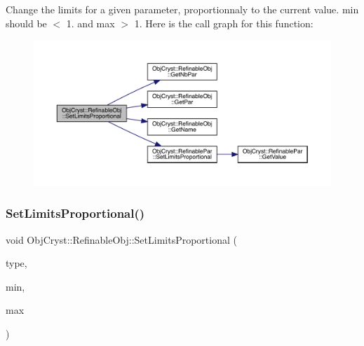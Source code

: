 Change the limits for a given parameter, proportionnaly to the current value. min should be $<$ 1. and max $>$ 1. Here is the call graph for this function\+:
\nopagebreak
\begin{figure}[H]
\begin{center}
\leavevmode
\includegraphics[width=350pt]{class_obj_cryst_1_1_refinable_obj_adc6b05a95d524d600910a47861190e84_cgraph}
\end{center}
\end{figure}
\mbox{\label{class_obj_cryst_1_1_refinable_obj_a75741a3e7f7f1740243901b60f406e93}} 
\subsubsection{\texorpdfstring{SetLimitsProportional()}{SetLimitsProportional()}\hspace{0.1cm}{\footnotesize\ttfamily [2/2]}}
{\footnotesize\ttfamily void Obj\+Cryst\+::\+Refinable\+Obj\+::\+Set\+Limits\+Proportional (\begin{DoxyParamCaption}\item[{const \mbox{\hyperlink{class_obj_cryst_1_1_ref_par_type}{Ref\+Par\+Type}} $\ast$}]{type,  }\item[{const R\+E\+AL}]{min,  }\item[{const R\+E\+AL}]{max }\end{DoxyParamCaption})}

